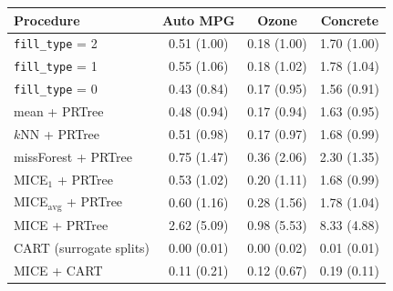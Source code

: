 \begin{tabular}{lccc}
\toprule
Procedure & Auto MPG & Ozone & Concrete\\
\midrule
\texttt{fill\_type} = 2 & 0.51 (1.00) & 0.18 (1.00) & 1.70 (1.00)\\
\texttt{fill\_type} = 1 & 0.55 (1.06) & 0.18 (1.02) & 1.78 (1.04)\\
\texttt{fill\_type} = 0 & 0.43 (0.84) & 0.17 (0.95) & 1.56 (0.91)\\
mean + PRTree & 0.48 (0.94) & 0.17 (0.94) & 1.63 (0.95)\\
$k$NN + PRTree & 0.51 (0.98) & 0.17 (0.97) & 1.68 (0.99)\\
missForest + PRTree & 0.75 (1.47) & 0.36 (2.06) & 2.30 (1.35)\\
MICE$_1$ + PRTree & 0.53 (1.02) & 0.20 (1.11) & 1.68 (0.99)\\
MICE$_{\mathrm{avg}}$ + PRTree & 0.60 (1.16) & 0.28 (1.56) & 1.78 (1.04)\\
MICE + PRTree & 2.62 (5.09) & 0.98 (5.53) & 8.33 (4.88)\\
CART (surrogate splits) & 0.00 (0.01) & 0.00 (0.02) & 0.01 (0.01)\\
MICE + CART & 0.11 (0.21) & 0.12 (0.67) & 0.19 (0.11)\\
\bottomrule
\end{tabular}
